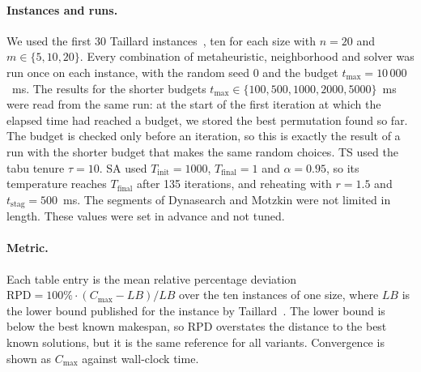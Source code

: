 \documentclass[10pt,twoside,twocolumn,a4paper]{article}
\newif\ifrevmarks \revmarksfalse
\newcommand{\rev}[1]{\ifrevmarks\textcolor{red}{#1}\else#1\fi}
\newenvironment{revblock}{\ifrevmarks\color{red}\fi}{}
\begin{document}
\begin{revblock}
\paragraph{Instances and runs.} We used the first 30 Taillard instances~\cite{ref_taillard}, ten for each size with $n=20$ and $m\in\{5,10,20\}$. Every combination of metaheuristic, neighborhood and solver was run once on each instance, with the random seed 0 and the budget $t_{\max}=10\,000$~ms. The results for the shorter budgets $t_{\max}\in\{100,500,1000,2000,5000\}$~ms were read from the same run: at the start of the first iteration at which the elapsed time had reached a budget, we stored the best permutation found so far. The budget is checked only before an iteration, so this is exactly the result of a run with the shorter budget that makes the same random choices. TS used the tabu tenure $\tau=10$. SA used $T_{\text{init}}=1000$, $T_{\text{final}}=1$ and $\alpha=0.95$, so its temperature reaches $T_{\text{final}}$ after 135 iterations, and reheating with $r=1.5$ and $t_{\text{stag}}=500$~ms. The segments of Dynasearch and Motzkin were not limited in length. These values were set in advance and not tuned.

\paragraph{Metric.} Each table entry is the mean relative percentage deviation $\mathrm{RPD}=100\%\cdot(C_{\max}-LB)/LB$ over the ten instances of one size, where $LB$ is the lower bound published for the instance by Taillard~\cite{ref_taillard}. The lower bound is below the best known makespan, so RPD overstates the distance to the best known solutions, but it is the same reference for all variants. Convergence is shown as $C_{\max}$ against wall-clock time.
\end{revblock}

\begin{table}
\caption{\rev{Mean RPD~[\%] from the lower bound for TS by solver, neighborhood, budget $t_{\max}$ and number of machines ($n=20$)}}
\label{tab:results_ts}
\centering\scriptsize\ifrevmarks\color{red}\fi


\vspace{3mm}
\caption{\rev{Mean RPD~[\%] from the lower bound for SA by solver, neighborhood, budget $t_{\max}$ and number of machines ($n=20$)}}
\label{tab:results_sa}

\end{table}
\end{document}
